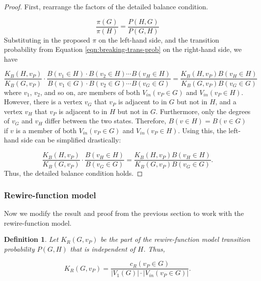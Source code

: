 \documentclass[a4paper,10pt]{article}
\newtheorem{defn}{Definition}
\begin{document}
\begin{proof}
First, rearrange the factors of the detailed balance condition. 

\begin{equation}
 \frac{\pi(G)}{\pi(H)} = \frac{P(H, G)}{P(G, H)}
\end{equation}
Substituting in the proposed $\pi$ on the left-hand side, and the transition probability from Equation \ref{eqn:breaking-trans-prob} on the right-hand side, we have

\begin{equation}
 \frac{K_B(H, v_P)}{K_B(G, v_P)} \cdot \frac{B(v_1 \in H) \cdot B(v_2 \in H) \cdots B(v_H \in H)}
{B(v_1 \in G) \cdot B(v_2 \in G) \cdots B(v_G \in G)} = 
\frac{K_B(H, v_P) B(v_H \in H)}{K_B(G, v_P) B(v_G \in G)}
\end{equation}
where $v_1$, $v_2$, and so on, are members of both $V_{in}(v_P \in G)$ and $V_{in}(v_P \in H)$. However, there is a vertex $v_G$ that $v_P$ is adjacent to in $G$ but not in $H$, and a vertex $v_H$ that $v_P$ is adjacent to in $H$ but not in $G$. Furthermore, only the degrees of $v_G$ and $v_H$ differ between the two states. Therefore, $B(v \in H) = B(v \in G)$ if $v$ is a member of both $V_{in}(v_P \in G)$ and $V_{in}(v_P \in H)$. Using this, the left-hand side can be simplified drastically:

\begin{equation}
  \frac{K_B(H, v_P)}{K_B(G, v_P)} \cdot \frac{B(v_H \in H)}{B(v_G \in G)} = 
\frac{K_B(H, v_P) B(v_H \in H)}{K_B(G, v_P) B(v_G \in G)}.
\end{equation}
Thus, the detailed balance condition holds.

\end{proof}

\subsubsection{Rewire-function model}
Now we modify the result and proof from the previous section to work with the rewire-function model.

\begin{defn}
 Let $K_R(G, v_P)$ be the part of the rewire-function model transition probability $P(G, H)$ that is independent of $H$. Thus,

\begin{equation}
 K_R(G, v_P) = \frac{c_R(v_P \in G)}{|V_1(G)| \cdot |V_{in}(v_P \in G)|}.
\end{equation}
 
\end{defn}
\end{document}
